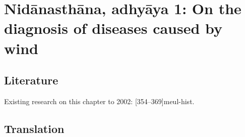 
\section{Nidānasthāna, adhyāya 1: On the diagnosis of diseases caused 
by wind  }

\subsection{Literature}

Existing research on this chapter to 2002: [354--369]{meul-hist}.

\subsection{Translation}

